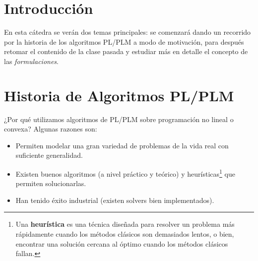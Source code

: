 
\newcommand{\sca}{Matías Azócar}
\newcommand{\scb}{Carolina Chiu}
\newcommand{\scc}{Francisco Muñoz}
\newcommand{\catnum}{2} %
\newcommand{\fecha}{\today}


\newcommand{\cin}{\operatorname{cint}}





\section*{Introducción}

En esta cátedra se verán dos temas principales: se comenzará dando un recorrido por la historia de los algoritmos PL/PLM a modo de motivación, para después retomar el contenido de la clase pasada y estudiar más en detalle el concepto de las \textit{formulaciones}.

\section{Historia de Algoritmos PL/PLM}
¿Por qué utilizamos algoritmos de PL/PLM sobre programación no lineal o convexa? Algunas razones son:
\begin{itemize}
    \item Permiten modelar una gran variedad de problemas de la vida real con suficiente generalidad.
    \item Existen buenos algoritmos (a nivel práctico y teórico) y heurísticas\footnote{Una \textbf{heurística} es una técnica diseñada para resolver un problema más rápidamente cuando los métodos clásicos son demasiados lentos, o bien, encontrar una solución cercana al óptimo cuando los métodos clásicos fallan.} que permiten solucionarlas.
    \item Han tenido éxito industrial (existen solvers bien implementados).
\end{itemize}

